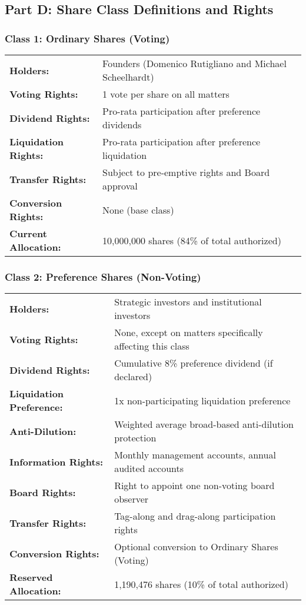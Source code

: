 \vspace{1em}

\subsection*{Part D: Share Class Definitions and Rights}

\subsubsection*{Class 1: Ordinary Shares (Voting)}
\begin{tabularx}{\textwidth}{@{} l X @{}}
\textbf{Holders:} & Founders (Domenico Rutigliano and Michael Scheelhardt) \\
\textbf{Voting Rights:} & 1 vote per share on all matters \\
\textbf{Dividend Rights:} & Pro-rata participation after preference dividends \\
\textbf{Liquidation Rights:} & Pro-rata participation after preference liquidation \\
\textbf{Transfer Rights:} & Subject to pre-emptive rights and Board approval \\
\textbf{Conversion Rights:} & None (base class) \\
\textbf{Current Allocation:} & 10,000,000 shares (84\% of total authorized)
\end{tabularx}

\vspace{1em}

\subsubsection*{Class 2: Preference Shares (Non-Voting)}
\begin{tabularx}{\textwidth}{@{} l X @{}}
\textbf{Holders:} & Strategic investors and institutional investors \\
\textbf{Voting Rights:} & None, except on matters specifically affecting this class \\
\textbf{Dividend Rights:} & Cumulative 8\% preference dividend (if declared) \\
\textbf{Liquidation Preference:} & 1x non-participating liquidation preference \\
\textbf{Anti-Dilution:} & Weighted average broad-based anti-dilution protection \\
\textbf{Information Rights:} & Monthly management accounts, annual audited accounts \\
\textbf{Board Rights:} & Right to appoint one non-voting board observer \\
\textbf{Transfer Rights:} & Tag-along and drag-along participation rights \\
\textbf{Conversion Rights:} & Optional conversion to Ordinary Shares (Voting) \\
\textbf{Reserved Allocation:} & 1,190,476 shares (10\% of total authorized)
\end{tabularx}

